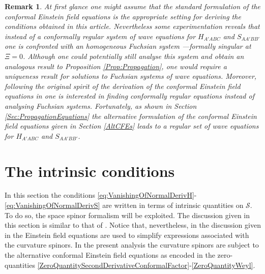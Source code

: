 \documentclass[10pt,a4paper]{article}
\theoremstyle{plain}
\newtheorem{remark}{Remark}
\begin{document}
\begin{remark}
\emph{ At first glance one might assume that the standard
  formulation of the conformal Einstein field equations is the
  appropriate setting for deriving the conditions obtained in this
  article. Nevertheless some experimentation reveals that instead of a
  conformally regular system of wave equations for $H_{A'ABC}$ and
  $S_{AA'BB'}$ one is confronted with an homogeneous Fuchsian system
  ---formally singular at $\Xi=0$. Although one could potentially
  still analyse this system and obtain an analogous result to
  Proposition \ref{Prop:Propagation}, one would require a uniqueness
  result for solutions to Fuchsian systems of wave
  equations. Moreover, following the original spirit of the derivation
  of the conformal Einstein field equations in \cite{Fri81a} one is
  interested in finding conformally regular equations instead of
  analysing Fuchsian systems. Fortunately, as shown in Section
  \ref{Sec:PropagationEquations} the alternative formulation of the
  conformal Einstein field equations given in Section \ref{AltCFEs}
  leads to a regular set of wave equations for $H_{A'ABC}$ and
  $S_{AA'BB'}$.  }
\end{remark}

\section{The intrinsic conditions}
\label{Sec:IntrinsicConditions}
In this section the conditions
\eqref{eq:VanishingOfNormalDerivH}-\eqref{eq:VanishingOfNormalDerivS}
are written in terms of intrinsic quantities on $\mathcal{S}$.  To do
so, the space spinor formalism will be exploited. The discussion given
in this section is similar to that of \cite{BaeVal10b}. Notice that,
nevertheless, in the discussion given in \cite{BaeVal10b} the Einstein
field equations are used to simplify expressions associated with the
curvature spinors. In the present analysis the curvature spinors are
subject to the alternative conformal Einstein field equations as
encoded in the zero-quantities
\eqref{ZeroQuantitySecondDerivativeConformalFactor}-\eqref{ZeroQuantityWeyl}.
\end{document}

